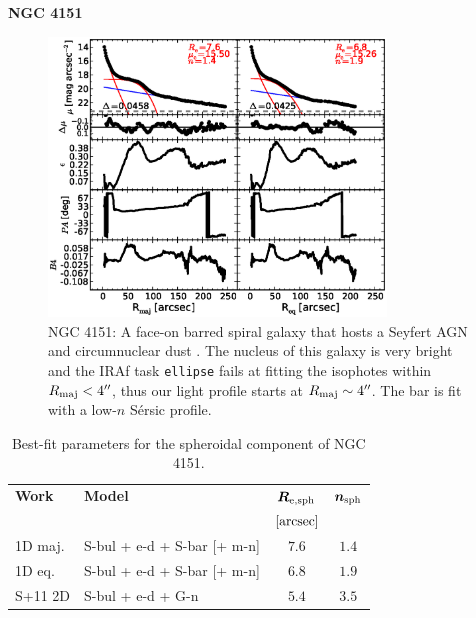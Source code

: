 \documentclass[preprint2]{emulateapj}
\newcommand{\fitfigurewidth}{0.8\textwidth}
\begin{document}
  \clearpage\newpage\noindent
  {\bf NGC 4151 \\}

  \begin{figure}[h]
  \begin{center}
  \includegraphics[width=\fitfigurewidth]{images/n4151_1Dfit.eps}
  \caption{NGC 4151:
  A face-on barred spiral galaxy that hosts a Seyfert AGN \citep{veroncettyveron2006} 
  and circumnuclear dust \citep{pott2010}.
  The nucleus of this galaxy is very bright and the IRAf task {\tt ellipse} fails at fitting the isophotes within $R_{\rm maj} < 4''$, 
  thus our light profile starts at $R_{\rm maj} \sim 4''$. 
  The bar is fit with a low-$n$ S\'ersic profile.  
  }
  \end{center}
  \end{figure}

  \begin{table}[h]
  \small
  \caption{Best-fit parameters for the spheroidal component of NGC 4151.}
  \begin{center}
  \begin{tabular}{llcc}
  \hline
  {\bf Work} & {\bf Model}   & $\bm R_{\rm e,sph}$    & $\bm n_{\rm sph}$ \\
    &  &  $[\rm arcsec]$ & \\
  \hline
  1D maj. & S-bul + e-d + S-bar [+ m-n] & $7.6$  &  $1.4$ \\
  1D eq.  & S-bul + e-d + S-bar [+ m-n] & $6.8$  &  $1.9$ \\
  \hline
  S+11 2D         & S-bul + e-d + G-n         & $5.4$  &  $3.5$ \\
  \hline
  \end{tabular}
  \end{center}
  \label{tab:n4151}
  \end{table}
\end{document}
